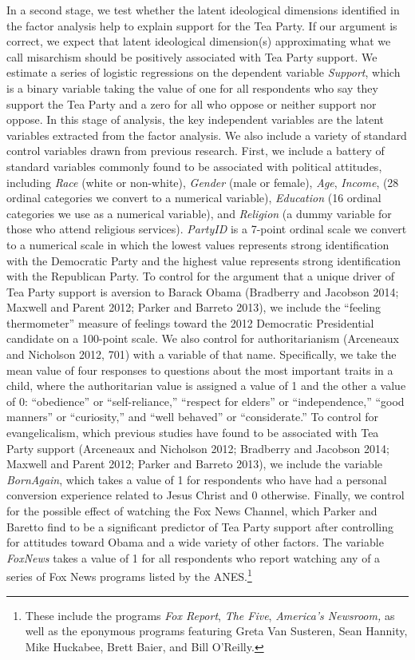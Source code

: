\documentclass[12pt,]{article}
\begin{document}
In a second stage, we test whether the latent ideological dimensions
identified in the factor analysis help to explain support for the Tea
Party. If our argument is correct, we expect that latent ideological
dimension(s) approximating what we call misarchism should be positively
associated with Tea Party support. We estimate a series of logistic
regressions on the dependent variable \emph{Support}, which is a binary
variable taking the value of one for all respondents who say they
support the Tea Party and a zero for all who oppose or neither support
nor oppose. In this stage of analysis, the key independent variables are
the latent variables extracted from the factor analysis. We also include
a variety of standard control variables drawn from previous research.
First, we include a battery of standard variables commonly found to be
associated with political attitudes, including \emph{Race} (white or
non-white), \emph{Gender} (male or female), \emph{Age}, \emph{Income},
(28 ordinal categories we convert to a numerical variable),
\emph{Education} (16 ordinal categories we use as a numerical variable),
and \emph{Religion} (a dummy variable for those who attend religious
services). \emph{PartyID} is a 7-point ordinal scale we convert to a
numerical scale in which the lowest values represents strong
identification with the Democratic Party and the highest value
represents strong identification with the Republican Party. To control
for the argument that a unique driver of Tea Party support is aversion
to Barack Obama (Bradberry and Jacobson 2014; Maxwell and Parent 2012;
Parker and Barreto 2013), we include the ``feeling thermometer'' measure
of feelings toward the 2012 Democratic Presidential candidate on a
100-point scale. We also control for authoritarianism (Arceneaux and
Nicholson 2012, 701) with a variable of that name. Specifically, we take
the mean value of four responses to questions about the most important
traits in a child, where the authoritarian value is assigned a value of
1 and the other a value of 0: ``obedience'' or ``self-reliance,''
``respect for elders'' or ``independence,'' ``good manners'' or
``curiosity,'' and ``well behaved'' or ``considerate.'' To control for
evangelicalism, which previous studies have found to be associated with
Tea Party support (Arceneaux and Nicholson 2012; Bradberry and Jacobson
2014; Maxwell and Parent 2012; Parker and Barreto 2013), we include the
variable \emph{BornAgain}, which takes a value of 1 for respondents who
have had a personal conversion experience related to Jesus Christ and 0
otherwise. Finally, we control for the possible effect of watching the
Fox News Channel, which Parker and Baretto find to be a significant
predictor of Tea Party support after controlling for attitudes toward
Obama and a wide variety of other factors. The variable \emph{FoxNews}
takes a value of 1 for all respondents who report watching any of a
series of Fox News programs listed by the ANES.\footnote{These include
  the programs \emph{Fox Report}, \emph{The Five}, \emph{America's
  Newsroom,} as well as the eponymous programs featuring Greta Van
  Susteren, Sean Hannity, Mike Huckabee, Brett Baier, and Bill O'Reilly.}
\end{document}
